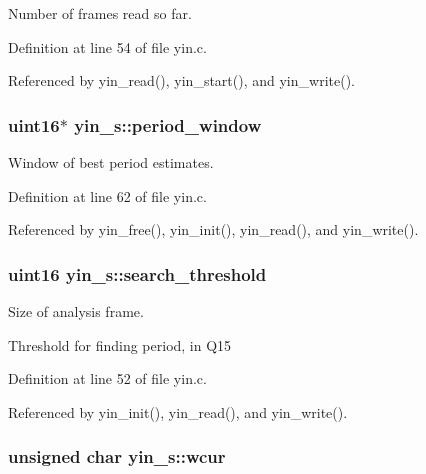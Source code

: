 \-Number of frames read so far. 



\-Definition at line 54 of file yin.\-c.



\-Referenced by yin\-\_\-read(), yin\-\_\-start(), and yin\-\_\-write().

\subsubsection[{period\-\_\-window}]{\setlength{\rightskip}{0pt plus 5cm}uint16$\ast$ {\bf yin\-\_\-s\-::period\-\_\-window}}\label{structyin__s_a1928cec127e250f6cd15249085bc9fc8}


\-Window of best period estimates. 



\-Definition at line 62 of file yin.\-c.



\-Referenced by yin\-\_\-free(), yin\-\_\-init(), yin\-\_\-read(), and yin\-\_\-write().

\subsubsection[{search\-\_\-threshold}]{\setlength{\rightskip}{0pt plus 5cm}uint16 {\bf yin\-\_\-s\-::search\-\_\-threshold}}\label{structyin__s_a8cca938167af6b504458ff9578420afd}


\-Size of analysis frame. 

\-Threshold for finding period, in \-Q15 

\-Definition at line 52 of file yin.\-c.



\-Referenced by yin\-\_\-init(), yin\-\_\-read(), and yin\-\_\-write().

\subsubsection[{wcur}]{\setlength{\rightskip}{0pt plus 5cm}unsigned char {\bf yin\-\_\-s\-::wcur}}\label{structyin__s_ab79376deb3761d5d3ae72f727ac25660}


